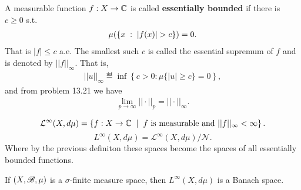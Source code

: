 \begin{definition}
    A measurable function $f:X\rightarrow \mathbb{C}$ is called \textbf{essentially bounded} if there is $c\geq 0$ s.t. 
    \begin{align}
    \mu(\left\{ x\omm:\omm |f(x)|>c \right\})=0.    
    \end{align}
    That is $|f|\leq c$ a.e. The smallest such $c$ is called the essential supremum of $f$ and is denoted by $||f||_\infty.$ That is,
    \begin{align*}
        ||u||_{\infty} \eqdef \inf\left\{c>0:\mu\{|u|\geq c\}=0\right\},
    \end{align*}
    and from problem 13.21 we have
    \begin{align*}
        \lim\limits_{p\rightarrow\infty} ||\cdot ||_p = ||\cdot||_{\infty}.
    \end{align*}
\end{definition}

\begin{definition}
    $$\mathcal L^\infty(X,d\mu) = \left\{ f:X\rightarrow \mathbb{C}\hspace{2mm}|\hspace{2mm} f\text{ is measurable and }||f||_\infty <\infty \right\}.$$
    $$L^\infty (X,d\mu) =\mathcal L^\infty(X,d\mu)/\mathcal N. $$
    Where by the previous definiton these spaces become the spaces of all essentially bounded functions. 
\end{definition}
\begin{theorem}
    If $(X,\mathscr{B},\mu)$ is a $\sigma$-finite measure space, then $L^\infty(X,d\mu)$ is a Banach space.
\end{theorem}
